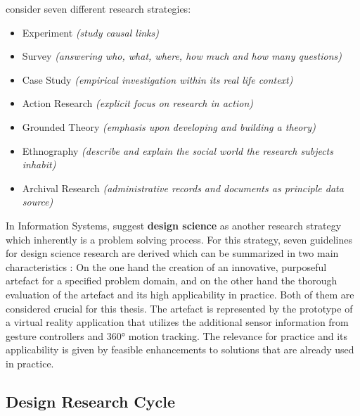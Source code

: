\cite{Saunders2009} consider seven different research strategies:
\begin{itemize}[noitemsep,nolistsep]
	\item Experiment \textit{(study causal links)}
	\item Survey \textit{(answering who, what, where, how much and how many questions)}
	\item Case Study \textit{(empirical investigation within its real life context)}
	\item Action Research \textit{(explicit focus on research in action)}
	\item Grounded Theory \textit{(emphasis upon developing and building a theory)}
	\item Ethnography \textit{(describe and explain the social world the research subjects inhabit)}
	\item Archival Research \textit{(administrative records and documents as principle data source)}
\end{itemize}
In Information Systems, \cite{Hevner2010} suggest \textbf{design science} as another research strategy which inherently is a problem solving process. For this strategy, seven guidelines for design science research are derived which can be summarized in two main characteristics \citep{Hevner2010}: On the one hand the creation of an innovative, purposeful artefact for a specified problem domain, and on the other hand the thorough evaluation of the artefact and its high applicability in practice. Both of them are considered crucial for this thesis. \newline
The artefact is represented by the prototype of a virtual reality application that utilizes the additional sensor information from gesture controllers and 360° motion tracking. The relevance for practice and its applicability is given by feasible enhancements to solutions that are already used in practice.




\subsection{Design Research Cycle}

